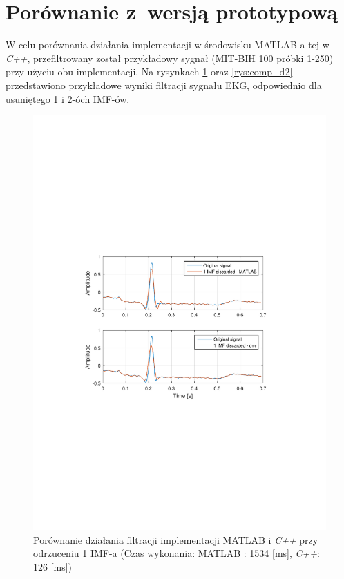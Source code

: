 \section{Porównanie z~wersją prototypową}
\indent

W celu porównania działania implementacji w środowisku \textrm{MATLAB} a tej w
\textit{C++}, przefiltrowany został przykładowy sygnał (MIT-BIH 100 próbki
1-250) przy użyciu obu implementacji. Na rysynkach \ref{rys:comp_d1} oraz
\ref{rys:comp_d2} przedstawiono przykładowe wyniki filtracji sygnału EKG,
odpowiednio dla usuniętego 1 i 2-óch IMF-ów.

\begin{figure}[!htb]
    \begin{center}
        \includegraphics[width=14cm,trim=4cm 9cm 4cm 9cm,clip]
        {../img/mat_cpp_domp_d1.pdf}
    \end{center}
    \caption{Porównanie działania filtracji implementacji \textrm{MATLAB} i
    \textit{C++} przy odrzuceniu 1 IMF-a (Czas wykonania: \textrm{MATLAB} : 1534
    [ms], \textit{C++}: 126 [ms])}
    \label{rys:comp_d1}
\end{figure}

